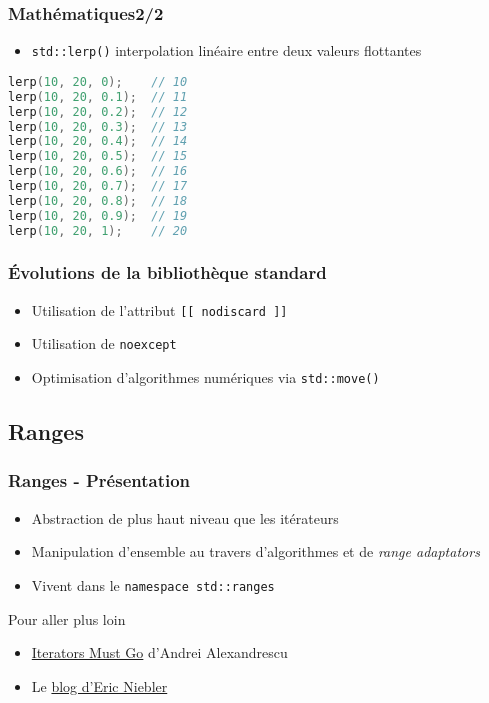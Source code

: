 \documentclass[C++.tex]{subfiles}
\begin{document}
\begin{frame}[fragile]
\frametitle{Mathématiques\titlehfill{}2/2}
	\begin{itemize}
		\item \lstinline|std::lerp()| interpolation linéaire entre deux valeurs flottantes
	\end{itemize}

	\begin{lstlisting}[language=C++]
lerp(10, 20, 0);    // 10
lerp(10, 20, 0.1);  // 11
lerp(10, 20, 0.2);  // 12
lerp(10, 20, 0.3);  // 13
lerp(10, 20, 0.4);  // 14
lerp(10, 20, 0.5);  // 15
lerp(10, 20, 0.6);  // 16
lerp(10, 20, 0.7);  // 17
lerp(10, 20, 0.8);  // 18
lerp(10, 20, 0.9);  // 19
lerp(10, 20, 1);    // 20\end{lstlisting}
\end{frame}

\begin{frame}[fragile]
	\frametitle{Évolutions de la bibliothèque standard}
	\begin{itemize}
		\item Utilisation de l'attribut \lstinline|[[ nodiscard ]]|
		\item Utilisation de \lstinline|noexcept|
		\item Optimisation d'algorithmes numériques via \lstinline|std::move()|

	\end{itemize}
\end{frame}

\subsection*{Ranges}
\begin{frame}
	\frametitle{Ranges - Présentation}
	\begin{itemize}
		\item Abstraction de plus haut niveau que les itérateurs
		\item Manipulation d'ensemble au travers d'algorithmes et de \textit{range adaptators}
		\item Vivent dans le \lstinline|namespace std::ranges|

	\end{itemize}

	\begin{block}{Pour aller plus loin}
		\begin{itemize}
			\item \href{https://accu.org/content/conf2009/AndreiAlexandrescu_iterators-must-go.pdf}{\og Iterators Must Go\fg{}} d'Andrei Alexandrescu


			\item Le \href{http://ericniebler.com/}{blog d'Eric Niebler}
		\end{itemize}
	\end{block}
\end{frame}
\end{document}
